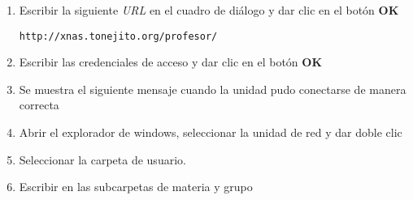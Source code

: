 {\begin{enumerate}
  \item Escribir la siguiente \textit{URL} en el cuadro de di\'{a}logo y dar clic en el bot\'{o}n \textbf{OK}

    \texttt{http://xnas.tonejito.org/profesor/}


  \item Escribir las credenciales de acceso y dar clic en el bot\'{o}n \textbf{OK}


  \item Se muestra el siguiente mensaje cuando la unidad pudo conectarse de manera correcta


  \item Abrir el explorador de windows, seleccionar la unidad de red y dar doble clic


  \item Seleccionar la carpeta de usuario.


  \item Escribir en las subcarpetas de materia y grupo

\end{enumerate}
}

